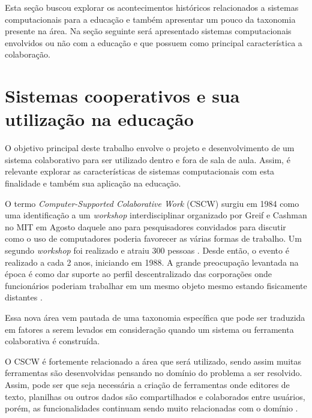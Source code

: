Esta seção buscou explorar os acontecimentos históricos relacionados a sistemas computacionais para a educação e também apresentar um pouco da taxonomia presente na área. Na seção seguinte será apresentado sistemas computacionais envolvidos ou não com a educação e que possuem como principal característica a colaboração.



\section{Sistemas cooperativos e sua utilização na educação}


O objetivo principal deste trabalho envolve o projeto e desenvolvimento de um sistema colaborativo para ser utilizado dentro e fora de sala de aula. Assim, é relevante explorar as características de sistemas computacionais com esta finalidade e também sua aplicação na educação.

O termo \emph{Computer-Supported Colaborative Work} (CSCW) surgiu em 1984 como uma identificação a um \emph{workshop} interdisciplinar organizado por Greif e Cashman no MIT em Agosto daquele ano para pesquisadores convidados para discutir como o uso de computadores poderia favorecer as várias formas de trabalho. Um segundo \emph{workshop} foi realizado e atraiu 300 pessoas \cite{greif1988}. Desde então, o evento é realizado a cada 2 anos, iniciando em 1988. A grande preocupação levantada na época é como dar suporte ao perfil descentralizado das corporações onde funcionários poderiam trabalhar em um mesmo objeto mesmo estando fisicamente distantes \cite{reinhard_cscw_1994}.

Essa nova área vem pautada de uma taxonomia específica que pode ser traduzida em fatores a serem levados em consideração quando um sistema ou ferramenta colaborativa é construída.

O CSCW é fortemente relacionado a área que será utilizado, sendo assim muitas ferramentas são desenvolvidas pensando no domínio do problema a ser resolvido. Assim, pode ser que seja necessária a criação de ferramentas onde editores de texto, planilhas ou outros dados são compartilhados e colaborados entre usuários, porém, as funcionalidades continuam sendo muito relacionadas com o domínio \cite{reinhard_cscw_1994}.

